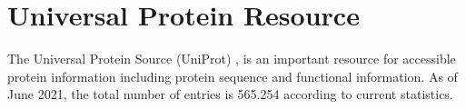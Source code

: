\section{Universal Protein Resource}
The Universal Protein Source (UniProt) \cite{uniprot2021uniprot}, is an important resource for accessible protein information including protein sequence and functional information. As of June 2021, the total number of entries is 565.254  according to current statistics. 

